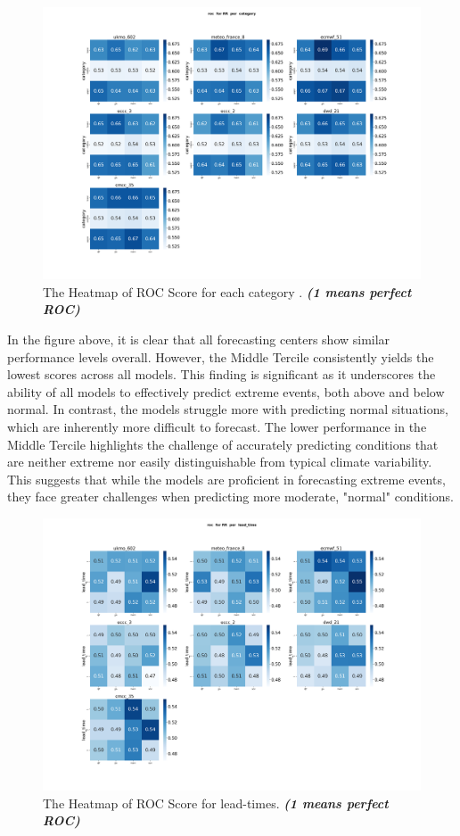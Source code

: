 \begin{figure}[H]
    \centering
    \includegraphics[scale=0.25]{plots/prob/roc/roc_RR_category.png}
    \caption{The Heatmap of ROC Score for each category  . \textbf{\textit{(1 means perfect ROC)}}}
\end{figure}

In the figure above, it is clear that all forecasting centers show similar performance levels overall. However, the Middle Tercile consistently yields the lowest scores across all models. This finding is significant as it underscores the ability of all models to effectively predict extreme events, both above and below normal. In contrast, the models struggle more with predicting normal situations, which are inherently more difficult to forecast. The lower performance in the Middle Tercile highlights the challenge of accurately predicting conditions that are neither extreme nor easily distinguishable from typical climate variability. This suggests that while the models are proficient in forecasting extreme events, they face greater challenges when predicting more moderate, "normal" conditions.
\begin{figure}[H]
    \centering
    \includegraphics[scale=0.25]{plots/prob/roc/roc_RR_lead_time.png}
    \caption{The Heatmap of ROC Score for lead-times. \textbf{\textit{(1 means perfect ROC)}}}
\end{figure}

